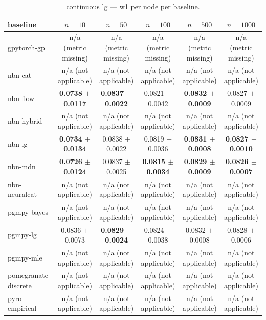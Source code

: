 \begin{table}[h]
\centering
\caption{continuous lg — w1 per node per baseline.}
\label{tab:continuous_lg_w1_per_node}
\begin{tabular}{lccccc}
\toprule
baseline & $n=10$ & $n=50$ & $n=100$ & $n=500$ & $n=1000$ \\
\midrule
gpytorch-gp & n/a (metric missing) & n/a (metric missing) & n/a (metric missing) & n/a (metric missing) & n/a (metric missing) \\
nbn-cat & n/a (not applicable) & n/a (not applicable) & n/a (not applicable) & n/a (not applicable) & n/a (not applicable) \\
nbn-flow & \textbf{0.0738 $\pm$ 0.0117} & \textbf{0.0837 $\pm$ 0.0022} & 0.0821 $\pm$ 0.0042 & \textbf{0.0832 $\pm$ 0.0009} & 0.0827 $\pm$ 0.0009 \\
nbn-hybrid & n/a (not applicable) & n/a (not applicable) & n/a (not applicable) & n/a (not applicable) & n/a (not applicable) \\
nbn-lg & \textbf{0.0734 $\pm$ 0.0134} & 0.0838 $\pm$ 0.0022 & 0.0819 $\pm$ 0.0036 & \textbf{0.0831 $\pm$ 0.0008} & \textbf{0.0827 $\pm$ 0.0010} \\
nbn-mdn & \textbf{0.0726 $\pm$ 0.0124} & 0.0837 $\pm$ 0.0025 & \textbf{0.0815 $\pm$ 0.0034} & \textbf{0.0829 $\pm$ 0.0009} & \textbf{0.0826 $\pm$ 0.0007} \\
nbn-neuralcat & n/a (not applicable) & n/a (not applicable) & n/a (not applicable) & n/a (not applicable) & n/a (not applicable) \\
pgmpy-bayes & n/a (not applicable) & n/a (not applicable) & n/a (not applicable) & n/a (not applicable) & n/a (not applicable) \\
pgmpy-lg & 0.0836 $\pm$ 0.0073 & \textbf{0.0829 $\pm$ 0.0024} & 0.0824 $\pm$ 0.0038 & 0.0832 $\pm$ 0.0008 & 0.0828 $\pm$ 0.0006 \\
pgmpy-mle & n/a (not applicable) & n/a (not applicable) & n/a (not applicable) & n/a (not applicable) & n/a (not applicable) \\
pomegranate-discrete & n/a (not applicable) & n/a (not applicable) & n/a (not applicable) & n/a (not applicable) & n/a (not applicable) \\
pyro-empirical & n/a (not applicable) & n/a (not applicable) & n/a (not applicable) & n/a (not applicable) & n/a (not applicable) \\
\bottomrule
\end{tabular}
\end{table}

